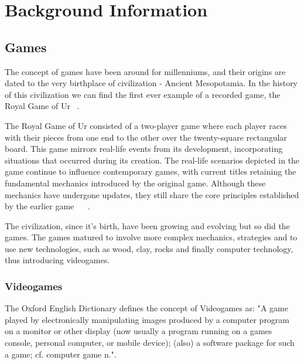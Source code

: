 
\section{Background Information}
\subsection{Games}    
    The concept of games have been around for millenniums, and their origins are dated to the very birthplace of civilization - Ancient Mesopotamia. In the history of this civilization we can find the first ever example of a recorded game, the Royal Game of Ur ~\cite{Videogames_IntroductionToTheIndutry}.

    The Royal Game of Ur consisted of a two-player game where each player races with their pieces from one end to the other over the twenty-square rectangular board. This game mirrors real-life events from its development, incorporating situations that occurred during its creation. The real-life scenarios depicted in the game continue to influence contemporary games, with current titles retaining the fundamental mechanics introduced by the original game. Although these mechanics have undergone updates, they still share the core principles established by the earlier game ~\cite{Videogames_IntroductionToTheIndutry} ~\cite{RoyalGameUr_rules}.

    The civilization, since it's birth, have been growing and evolving but so did the games. The games matured to involve more complex mechanics, strategies and to use new technologies, such as wood, clay, rocks and finally computer technology, thus introducing videogames.

    \subsubsection{Videogames}

    The Oxford English Dictionary defines the concept of Videogames as: "A game played by electronically manipulating images produced by a computer program on a monitor or other display (now usually a program running on a games console, personal computer, or mobile device); (also) a software package for such a game; cf. computer game n."\cite{videogame_oed}.

